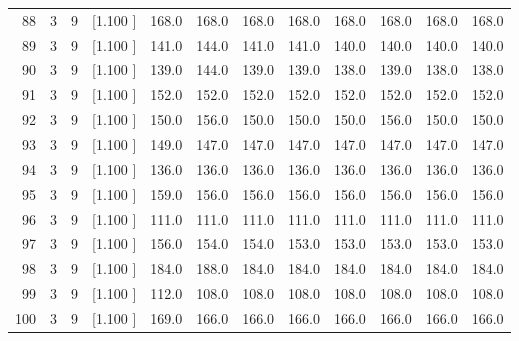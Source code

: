 \documentclass[12pt,a4paper]{article}
\begin{document}
\begin{center}
{\begin{tabular}{r r r r r r r r r r r r}
  88&  3&  9&[1.100     ]&   168.0&   168.0&   168.0&   168.0&   168.0&   168.0&   168.0&   168.0\\[-0.02in]
  89&  3&  9&[1.100     ]&   141.0&   144.0&   141.0&   141.0&   140.0&   140.0&   140.0&   140.0\\[-0.02in]
  90&  3&  9&[1.100     ]&   139.0&   144.0&   139.0&   139.0&   138.0&   139.0&   138.0&   138.0\\[-0.02in]
  91&  3&  9&[1.100     ]&   152.0&   152.0&   152.0&   152.0&   152.0&   152.0&   152.0&   152.0\\[-0.02in]
  92&  3&  9&[1.100     ]&   150.0&   156.0&   150.0&   150.0&   150.0&   156.0&   150.0&   150.0\\[-0.02in]
  93&  3&  9&[1.100     ]&   149.0&   147.0&   147.0&   147.0&   147.0&   147.0&   147.0&   147.0\\[-0.02in]
  94&  3&  9&[1.100     ]&   136.0&   136.0&   136.0&   136.0&   136.0&   136.0&   136.0&   136.0\\[-0.02in]
  95&  3&  9&[1.100     ]&   159.0&   156.0&   156.0&   156.0&   156.0&   156.0&   156.0&   156.0\\[-0.02in]
  96&  3&  9&[1.100     ]&   111.0&   111.0&   111.0&   111.0&   111.0&   111.0&   111.0&   111.0\\[-0.02in]
  97&  3&  9&[1.100     ]&   156.0&   154.0&   154.0&   153.0&   153.0&   153.0&   153.0&   153.0\\[-0.02in]
  98&  3&  9&[1.100     ]&   184.0&   188.0&   184.0&   184.0&   184.0&   184.0&   184.0&   184.0\\[-0.02in]
  99&  3&  9&[1.100     ]&   112.0&   108.0&   108.0&   108.0&   108.0&   108.0&   108.0&   108.0\\[-0.02in]
 100&  3&  9&[1.100     ]&   169.0&   166.0&   166.0&   166.0&   166.0&   166.0&   166.0&   166.0\\[-0.02in]

\hline
\end{tabular}}
\end{center}
\end{document}
